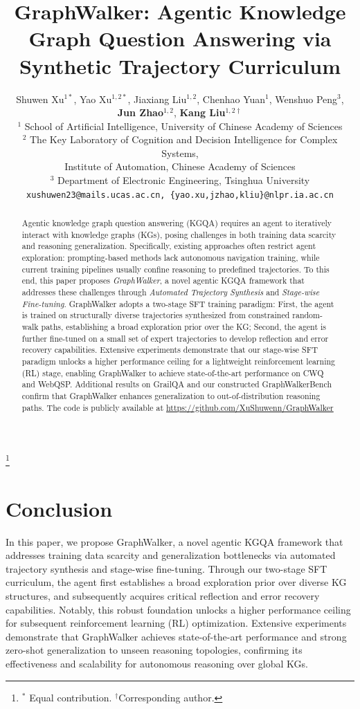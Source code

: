 \documentclass{article} %
\title{GraphWalker: Agentic Knowledge Graph Question Answering via Synthetic Trajectory Curriculum}
\author{Shuwen Xu$^{1\ast}$, Yao Xu$^{1,2\ast}$, Jiaxiang Liu$^{1,2}$, Chenhao Yuan$^1$, Wenshuo Peng$^3$, \\
\textbf{Jun Zhao}$^{1,2}$,
\textbf{Kang Liu}$^{1,2\dagger}$ \\
$^1$ School of Artificial Intelligence, University of Chinese Academy of Sciences \\
$^2$ The Key Laboratory of Cognition and Decision Intelligence for Complex Systems, \\ Institute of Automation, Chinese Academy of Sciences\\ 
$^3$ Department of Electronic Engineering, Tsinghua University \\ 
\texttt{xushuwen23@mails.ucas.ac.cn, \{yao.xu,jzhao,kliu\}@nlpr.ia.ac.cn}
}
\theoremstyle{remark}
\newcommand\blfootnote[1]{%
  \begingroup
  \renewcommand\thefootnote{}\footnote{#1}%
  \addtocounter{footnote}{-1}%
  \endgroup
}
\begin{document}
\ifcolmsubmission
\linenumbers
\fi

\maketitle
\blfootnote{$^\ast$ Equal contribution. $^\dagger$Corresponding author.}


\vspace{-3em}
\begin{abstract}
Agentic knowledge graph question answering (KGQA) requires an agent to iteratively interact with knowledge graphs (KGs), posing challenges in both training data scarcity and reasoning generalization. Specifically, existing approaches often restrict agent exploration: prompting-based methods lack autonomous navigation training, while current training pipelines usually confine reasoning to predefined trajectories. To this end, this paper proposes \textit{GraphWalker}, a novel agentic KGQA framework that addresses these challenges through \textit{Automated Trajectory Synthesis} and \textit{Stage-wise Fine-tuning}. GraphWalker adopts a two-stage SFT training paradigm: First, the agent is trained on structurally diverse trajectories synthesized from constrained random-walk paths, establishing a broad exploration prior over the KG; Second, the agent is further fine-tuned on a small set of expert trajectories to develop reflection and error recovery capabilities. Extensive experiments demonstrate that our stage-wise SFT paradigm unlocks a higher performance ceiling for a lightweight reinforcement learning (RL) stage, enabling GraphWalker to achieve state-of-the-art performance on CWQ and WebQSP. Additional results on GrailQA and our constructed GraphWalkerBench confirm that GraphWalker enhances generalization to out-of-distribution reasoning paths. The code is publicly available at \url{https://github.com/XuShuwenn/GraphWalker}
\end{abstract}





% 





\section{Conclusion}
In this paper, we propose GraphWalker, a novel agentic KGQA framework that addresses training data scarcity and generalization bottlenecks via automated trajectory synthesis and stage-wise fine-tuning. 
Through our two-stage SFT curriculum, the agent first establishes a broad exploration prior over diverse KG structures, and subsequently acquires critical reflection and error recovery capabilities. Notably, this robust foundation unlocks a higher performance ceiling for subsequent reinforcement learning (RL) optimization.
Extensive experiments demonstrate that GraphWalker achieves 
state-of-the-art performance and strong zero-shot generalization 
to unseen reasoning topologies, confirming its effectiveness and 
scalability for autonomous reasoning over global KGs.
\end{document}
